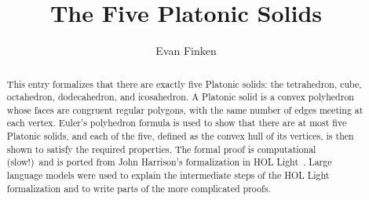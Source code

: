 \documentclass[11pt,a4paper]{article}
\begin{document}
\title{The Five Platonic Solids}
\author{Evan Finken}
\maketitle

\begin{abstract}
  This entry formalizes that there are exactly five Platonic solids: the
  tetrahedron, cube, octahedron, dodecahedron, and icosahedron. A Platonic
  solid is a convex polyhedron whose faces are congruent regular polygons,
  with the same number of edges meeting at each vertex. Euler's polyhedron
  formula is used to show that there are at most five Platonic solids, and
  each of the five, defined as the convex hull of its vertices, is then
  shown to satisfy the required properties. The formal proof is computational (slow!)\ 
  and is ported from John Harrison's formalization in HOL Light~\cite{holLightPlatonic}.
  Large language models were used to explain the intermediate steps of the
  HOL Light formalization and to write parts of the more complicated proofs.
\end{abstract}

\tableofcontents
\newpage





\end{document}
